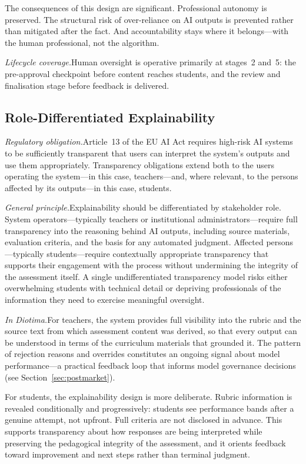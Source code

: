\documentclass[10pt, a4paper, twocolumn]{article}
\begin{document}
The consequences of this design are significant. Professional autonomy is preserved.
The structural risk of over-reliance on AI outputs is prevented rather than mitigated
after the fact. And accountability stays where it belongs---with the human professional,
not the algorithm.

\textit{Lifecycle coverage.}\quad Human oversight is operative primarily at stages~2
and~5: the pre-approval checkpoint before content reaches students, and the review and
finalisation stage before feedback is delivered.

\subsection{Role-Differentiated Explainability}

\textit{Regulatory obligation.}\quad Article~13 of the EU AI Act requires high-risk AI
systems to be sufficiently transparent that users can interpret the system's outputs and
use them appropriately. Transparency obligations extend both to the users operating the
system---in this case, teachers---and, where relevant, to the persons affected by its
outputs---in this case, students.

\textit{General principle.}\quad Explainability should be differentiated by stakeholder
role. System operators---typically teachers or institutional administrators---require
full transparency into the reasoning behind AI outputs, including source materials,
evaluation criteria, and the basis for any automated judgment. Affected
persons---typically students---require contextually appropriate transparency that
supports their engagement with the process without undermining the integrity of the
assessment itself. A single undifferentiated transparency model risks either
overwhelming students with technical detail or depriving professionals of the
information they need to exercise meaningful oversight.

\textit{In Diotima.}\quad For teachers, the system provides full visibility into the
rubric and the source text from which assessment content was derived, so that every
output can be understood in terms of the curriculum materials that grounded it. The pattern of rejection reasons and overrides constitutes an ongoing
signal about model performance---a practical feedback loop that informs model
governance decisions (see Section~\ref{sec:postmarket}).

For students, the explainability design is more deliberate. Rubric information is
revealed conditionally and progressively: students see performance bands after a
genuine attempt, not upfront. Full criteria are not disclosed in advance. This supports
transparency about how responses are being interpreted while preserving the pedagogical
integrity of the assessment, and it orients feedback toward improvement and next steps
rather than terminal judgment.
\end{document}
